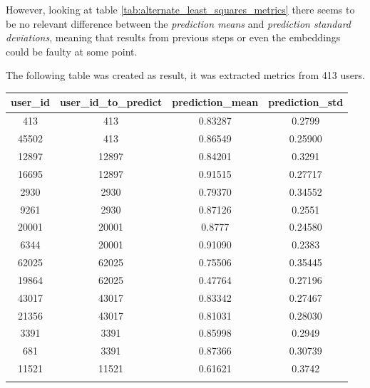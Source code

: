 \documentclass[ecp,tc,english]{iiufrgs}
\begin{document}
        However, looking at table \ref{tab:alternate_least_squares_metrics} there seems to be no relevant difference between the \textit{prediction means} and \textit{prediction standard deviations}, meaning that results from previous steps or even the embeddings could be faulty at some point.

        
        \newpage 

        The following table was created as result, it was extracted metrics from 413 users.
        \begin{table}[H]
            \centering
            \begin{tabular}{ |c|c|c|c| } 
                \hline
                user\_id & user\_id\_to\_predict & prediction\_mean & prediction\_std \\
                \hline 
                413 & 413 & 0.83287 & 0.2799 \\
                45502 & 413 & 0.86549 & 0.25900 \\
                \rowcolor[RGB]{220,220,220}
                12897 & 12897 & 0.84201 & 0.3291 \\
                \rowcolor[RGB]{220,220,220}        
                16695 & 12897 & 0.91515 & 0.27717 \\
                2930 & 2930 & 0.79370 & 0.34552 \\
                9261 & 2930 & 0.87126 & 0.2551 \\
                \rowcolor[RGB]{220,220,220}        
                20001 & 20001 & 0.8777 & 0.24580 \\
                \rowcolor[RGB]{220,220,220}        
                6344 & 20001 & 0.91090 & 0.2383 \\
                62025 & 62025 & 0.75506 & 0.35445 \\
                19864 & 62025 & 0.47764 & 0.27196 \\
                \rowcolor[RGB]{220,220,220}        
                43017 & 43017 & 0.83342 & 0.27467 \\
                \rowcolor[RGB]{220,220,220}        
                21356 & 43017 & 0.81031 & 0.28030 \\
                3391 & 3391 & 0.85998 & 0.2949 \\
                681 & 3391 & 0.87366 & 0.30739 \\
                \rowcolor[RGB]{220,220,220}        
                11521 & 11521 & 0.61621 & 0.3742 \\
                \rowcolor[RGB]{220,220,220}                

\end{tabular}
\end{table}
\end{document}

